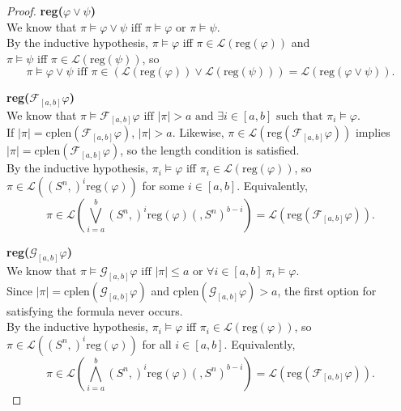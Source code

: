 \documentclass[runningheads]{llncs}
\renewcommand{\phi}{\varphi}
\begin{document}
\begin{proof}
 \noindent \textbf{reg($\varphi \lor \psi$)}\\
 We know that $\pi \vDash \varphi \lor \psi \text{ iff } \pi \vDash \varphi \text{ or } \pi \vDash \psi$.\\
 By the inductive hypothesis, $\pi \vDash \varphi$ iff $\pi \in \mathscr{L}(\text{reg}(\varphi))$ and 
 \\$\pi \vDash \psi$ iff $\pi \in \mathscr{L}(\text{reg}(\psi))$, so
 $$\pi \vDash \varphi \lor \psi \text{ iff } \pi \in (\mathscr{L}(\text{reg}(\varphi)) \lor \mathscr{L}(\text{reg}(\psi))) = \mathscr{L}(\text{reg}(\varphi \lor \psi)).$$
 
 \noindent \textbf{reg($\mathcal{F}_{[a,b]} \varphi$)}\\
 We know that $\pi \vDash \mathcal{F}_{[a,b]} \varphi \text{ iff } |\pi| > a \text{ and } \exists i \in [a,b] \text{ such that } \pi_i \vDash \varphi$.\\
 If $|\pi| = \text{cplen}(\mathcal{F}_{[a,b]} \varphi)$, $|\pi| > a$. Likewise, $\pi \in \mathscr{L}\left(\text{reg}\left(\mathcal{F}_{[a,b]} \varphi \right)\right)$ implies $|\pi| = \text{cplen}(\mathcal{F}_{[a,b]} \varphi)$, so the length condition is satisfied.\\
 By the inductive hypothesis, $\pi_i \vDash \varphi$ iff $\pi_i \in \mathscr{L}(\text{reg}(\varphi))$, so $\pi \in \mathscr{L}((S^n,)^i \text{reg}(\varphi))$ for some $i \in [a,b]$. Equivalently, 
 $$\pi \in \mathscr{L}\left(\bigvee_{i=a}^{b} (S^n,)^i \text{reg}(\phi)(,S^n)^{b-i}\right) = \mathscr{L}(\text{reg}(\mathcal{F}_{[a,b]}\varphi)).$$

 \noindent \textbf{reg($\mathcal{G}_{[a,b]} \varphi$)}\\
 We know that $\pi \vDash \mathcal{G}_{[a,b]}\varphi \text{ iff } |\pi| \leq a \text{ or } \forall i \in [a,b] \ \pi_i \vDash \varphi$.\\
 Since $|\pi| = \text{cplen}(\mathcal{G}_{[a,b]} \varphi)$ and $\text{cplen}(\mathcal{G}_{[a,b]} \varphi) > a$, the first option for satisfying the formula never occurs.\\
 By the inductive hypothesis, $\pi_i \vDash \varphi$ iff $\pi_i \in \mathscr{L}(\text{reg}(\varphi))$, so $\pi \in \mathscr{L}((S^n,)^i \text{reg}(\varphi))$ for all $i \in [a,b]$. Equivalently, 
 $$\pi \in \mathscr{L}\left(\bigwedge_{i=a}^{b} (S^n,)^i \text{reg}(\phi)(,S^n)^{b-i}\right) = \mathscr{L}(\text{reg}(\mathcal{F}_{[a,b]}\varphi)).$$
 

\end{proof}
\end{document}

